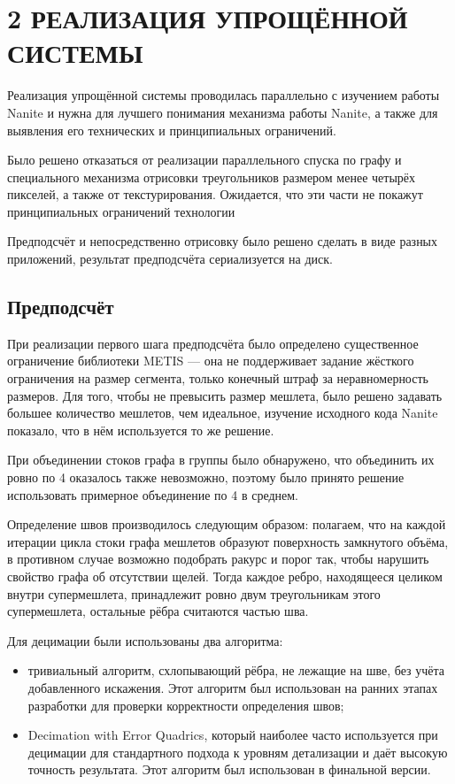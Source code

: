 \clearpage
\section{2 РЕАЛИЗАЦИЯ УПРОЩЁННОЙ СИСТЕМЫ}
Реализация упрощённой системы проводилась параллельно с изучением работы Nanite и нужна для лучшего понимания механизма работы Nanite, а также для выявления его технических и принципиальных ограничений.

Было решено отказаться от реализации параллельного спуска по графу и специального механизма отрисовки треугольников размером менее четырёх пикселей, а также от текстурирования.
Ожидается, что эти части не покажут принципиальных ограничений технологии

Предподсчёт и непосредственно отрисовку было решено сделать в виде разных приложений, результат предподсчёта сериализуется на диск.

\subsection{Предподсчёт}
При реализации первого шага предподсчёта было определено существенное ограничение библиотеки METIS --- она не поддерживает задание жёсткого ограничения на размер сегмента, только конечный штраф за неравномерность размеров.
Для того, чтобы не превысить размер мешлета, было решено задавать большее количество мешлетов, чем идеальное, изучение исходного кода Nanite показало, что в нём используется то же решение.

При объединении стоков графа в группы было обнаружено, что объединить их ровно по 4 оказалось также невозможно, поэтому было принято решение использовать примерное объединение по 4 в среднем.

Определение швов производилось следующим образом: полагаем, что на каждой итерации цикла стоки графа мешлетов образуют поверхность замкнутого объёма, в противном случае возможно подобрать ракурс и порог так, чтобы нарушить свойство графа об отсутствии щелей.
Тогда каждое ребро, находящееся целиком внутри супермешлета, принадлежит ровно двум треугольникам этого супермешлета, остальные рёбра считаются частью шва.

Для децимации были использованы два алгоритма:
\begin{itemize}
    \item тривиальный алгоритм, схлопывающий рёбра, не лежащие на шве, без учёта добавленного искажения.
    Этот алгоритм был использован на ранних этапах разработки для проверки корректности определения швов;
    \item Decimation with Error Quadrics, который наиболее часто используется при децимации для стандартного подхода к уровням детализации и даёт высокую точность результата.
    Этот алгоритм был использован в финальной версии.
\end{itemize}

